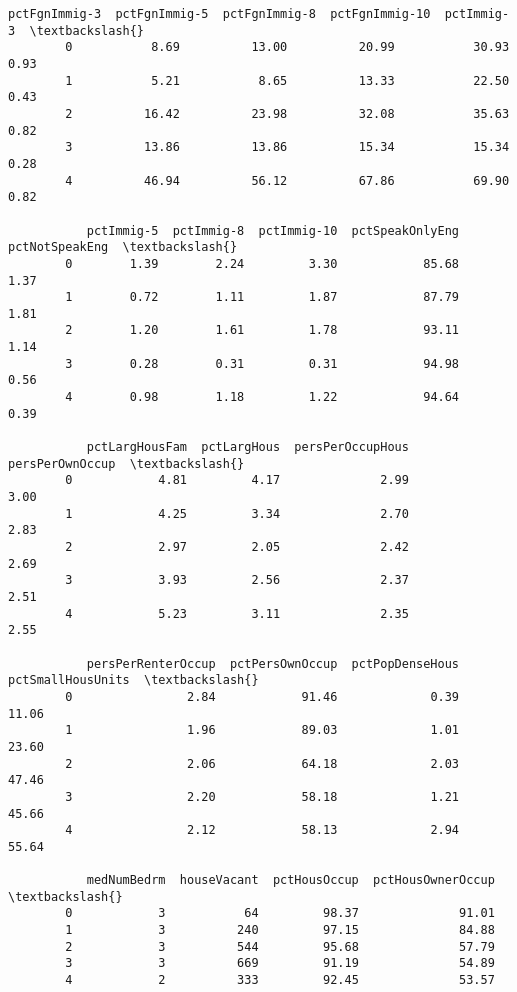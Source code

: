 \documentclass[11pt]{llncs}
\begin{document}
\begin{Verbatim}[commandchars=\\\{\}]
           pctFgnImmig-3  pctFgnImmig-5  pctFgnImmig-8  pctFgnImmig-10  pctImmig-3  \textbackslash{}
        0           8.69          13.00          20.99           30.93        0.93   
        1           5.21           8.65          13.33           22.50        0.43   
        2          16.42          23.98          32.08           35.63        0.82   
        3          13.86          13.86          15.34           15.34        0.28   
        4          46.94          56.12          67.86           69.90        0.82   
        
           pctImmig-5  pctImmig-8  pctImmig-10  pctSpeakOnlyEng  pctNotSpeakEng  \textbackslash{}
        0        1.39        2.24         3.30            85.68            1.37   
        1        0.72        1.11         1.87            87.79            1.81   
        2        1.20        1.61         1.78            93.11            1.14   
        3        0.28        0.31         0.31            94.98            0.56   
        4        0.98        1.18         1.22            94.64            0.39   
        
           pctLargHousFam  pctLargHous  persPerOccupHous  persPerOwnOccup  \textbackslash{}
        0            4.81         4.17              2.99             3.00   
        1            4.25         3.34              2.70             2.83   
        2            2.97         2.05              2.42             2.69   
        3            3.93         2.56              2.37             2.51   
        4            5.23         3.11              2.35             2.55   
        
           persPerRenterOccup  pctPersOwnOccup  pctPopDenseHous  pctSmallHousUnits  \textbackslash{}
        0                2.84            91.46             0.39              11.06   
        1                1.96            89.03             1.01              23.60   
        2                2.06            64.18             2.03              47.46   
        3                2.20            58.18             1.21              45.66   
        4                2.12            58.13             2.94              55.64   
        
           medNumBedrm  houseVacant  pctHousOccup  pctHousOwnerOccup  \textbackslash{}
        0            3           64         98.37              91.01   
        1            3          240         97.15              84.88   
        2            3          544         95.68              57.79   
        3            3          669         91.19              54.89   
        4            2          333         92.45              53.57   
        

\end{Verbatim}
\end{document}
